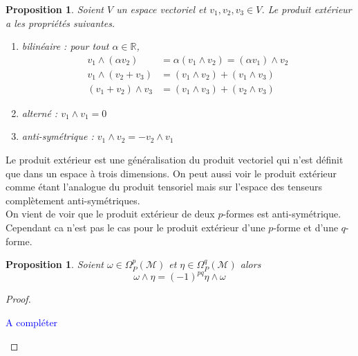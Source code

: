 \documentclass[a4paper,11pt]{report}
\theoremstyle{definition}
\theoremstyle{plain}
\newtheorem{prop}[thm]{Proposition}
\theoremstyle{definition}
\theoremstyle{remark}
\newcommand{\comp}{\begin{center}\textcolor{blue}{A compléter}\end{center}}
\newcommand{\M}{\mathscr{M}}
\begin{document}
            \begin{prop}
                Soient $V$ un espace vectoriel et $v_1,v_2,v_3\in V$. Le produit extérieur a les propriétés suivantes.
                \begin{enumerate}[label = \textit{\roman*)}]
                    \item bilinéaire : pour tout $\alpha\in\mathbb{R}$,
                    \begin{align}
                        v_1\wedge (\alpha v_2) &= \alpha(v_1\wedge v_2) = (\alpha v_1)\wedge v_2\\
                        v_1\wedge(v_2+v_3) &= (v_1\wedge v_2) + (v_1\wedge v_3)\\
                        (v_1+v_2)\wedge v_3 &= (v_1\wedge v_3) + (v_2\wedge v_3)
                    \end{align}
                    \item alterné : $v_1 \wedge v_1 = 0$
                    \item anti-symétrique : $v_1\wedge v_2 = -v_2\wedge v_1$
                \end{enumerate}
            \end{prop}
            
            Le produit extérieur est une généralisation du produit vectoriel qui n'est définit que dans un espace à trois dimensions. On peut aussi voir le produit extérieur comme étant l'analogue du produit tensoriel mais sur l'espace des tenseurs complètement anti-symétriques.\\
            
            On vient de voir que le produit extérieur de deux $p$-formes est anti-symétrique. Cependant ca n'est pas le cas pour le produit extérieur d'une $p$-forme et d'une $q$-forme.
            
            \begin{prop}
                Soient $\omega\in\Omega_P^p(\M)$ et $\eta\in \Omega_P^q(\M)$ alors
                \begin{equation}
                    \omega\wedge\eta = (-1)^{pq}\eta\wedge\omega
                \end{equation}
            \end{prop}
            
            \begin{proof}${}$\\
                \comp
            \end{proof}
            
\end{document}
